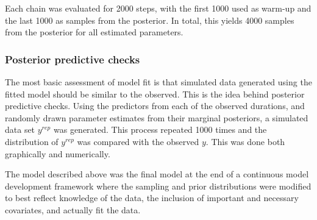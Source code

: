 \documentclass[12pt,letterpaper]{article}
\begin{document}
Each chain was evaluated for 2000 steps, with the first 1000 used as warm-up and the last 1000 as samples from the posterior. In total, this yields 4000 samples from the posterior for all estimated parameters. 


\subsubsection{Posterior predictive checks}

The most basic assessment of model fit is that simulated data generated using the fitted model should be similar to the observed. This is the idea behind posterior predictive checks. Using the predictors from each of the observed durations, and randomly drawn parameter estimates from their marginal posteriors, a simulated data set \(y^{rep}\) was generated. This process repeated 1000 times and the distribution of \(y^{rep}\) was compared with the observed \(y\). This was done both graphically and numerically.

The model described above was the final model at the end of a continuous model development framework where the sampling and prior distributions were modified to best reflect knowledge of the data, the inclusion of important and necessary covariates, and actually fit the data.

\end{document}
